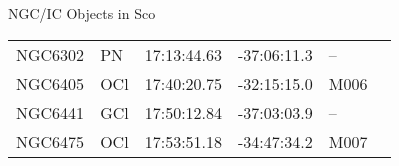 \begin{block}{NGC/IC Objects in Sco}
  \centering
  \begin{tabularx}{\textwidth}{llrrll} 
    NGC6302 & PN & 17:13:44.63 & -37:06:11.3  & -- \\ 
    NGC6405 & OCl & 17:40:20.75 & -32:15:15.0  & M006 \\ 
    NGC6441 & GCl & 17:50:12.84 & -37:03:03.9  & -- \\ 
    NGC6475 & OCl & 17:53:51.18 & -34:47:34.2  & M007 \\ 
  \end{tabularx}
\end{block}